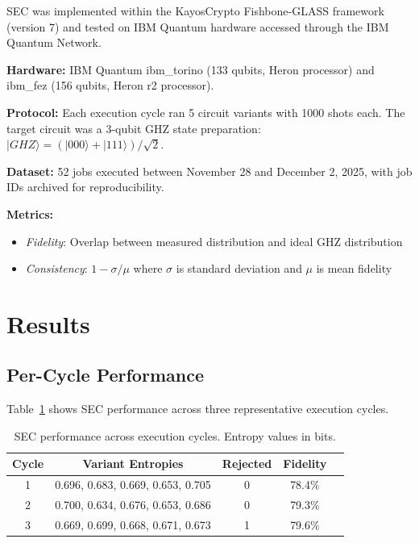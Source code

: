 \documentclass[twocolumn,preprintnumbers,amsmath,amssymb,prl]{revtex4-2}
\begin{document}
SEC was implemented within the KayosCrypto Fishbone-GLASS framework (version 7) and tested on IBM Quantum hardware accessed through the IBM Quantum Network. 

\textbf{Hardware:} IBM Quantum ibm\_torino (133 qubits, Heron processor) and ibm\_fez (156 qubits, Heron r2 processor).

\textbf{Protocol:} Each execution cycle ran 5 circuit variants with 1000 shots each. The target circuit was a 3-qubit GHZ state preparation: $|GHZ\rangle = (|000\rangle + |111\rangle)/\sqrt{2}$.

\textbf{Dataset:} 52 jobs executed between November 28 and December 2, 2025, with job IDs archived for reproducibility.

\textbf{Metrics:} 
\begin{itemize}
\item \textit{Fidelity}: Overlap between measured distribution and ideal GHZ distribution
\item \textit{Consistency}: $1 - \sigma/\mu$ where $\sigma$ is standard deviation and $\mu$ is mean fidelity
\end{itemize}

\section{Results}

\subsection{Per-Cycle Performance}

Table~\ref{tab:cycles} shows SEC performance across three representative execution cycles.

\begin{table}[h]
\caption{SEC performance across execution cycles. Entropy values in bits.}
\label{tab:cycles}
\begin{ruledtabular}
\begin{tabular}{ccccc}
Cycle & Variant Entropies & Rejected & Fidelity \\
\hline
1 & 0.696, 0.683, 0.669, 0.653, 0.705 & 0 & 78.4\% \\
2 & 0.700, 0.634, 0.676, 0.653, 0.686 & 0 & 79.3\% \\
3 & 0.669, 0.699, 0.668, 0.671, 0.673 & 1 & 79.6\% \\
\end{tabular}
\end{ruledtabular}
\end{table}
\end{document}
